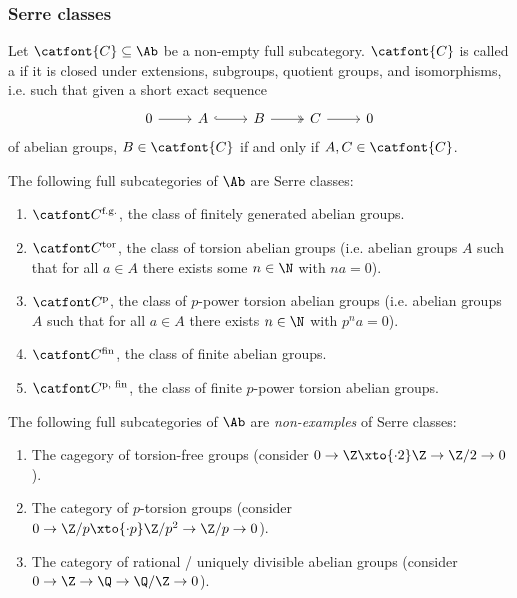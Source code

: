 \subsubsection{Serre classes}
\begin{definition}
	Let $\catfont{C} \subseteq \Ab$ be a non-empty full subcategory.
	$\catfont{C}$ is called a  if it is closed under extensions, subgroups, quotient groups, and isomorphisms, i.e. such that given a short exact sequence 
	\begin{equation*}
		\begin{tikzcd}
			0 
					\ar[r]
				& A
					\ar[r, hook]
				& B
					\ar[r, two heads]
				& C
					\ar[r]
				& 0
		\end{tikzcd}
	\end{equation*}
	of abelian groups, $B \in \catfont{C}$ if and only if $A, C \in \catfont{C}$.
\end{definition}
\begin{example}
	The following full subcategories of $\Ab$ are Serre classes:	
	\begin{enumerate}
		\item $\Cfg$, the class of finitely generated abelian groups.
		\item $\Ctor$, the class of torsion abelian groups (i.e. abelian groups $A$ such that for all $a \in A$ there exists some $n \in \N$ with $n a = 0$).
		\item $\Cptor$, the class of $p$-power torsion abelian groups (i.e. abelian groups $A$ such that for all $a \in A$ there exists $n \in \N$ with $p^n a = 0$).
		\item $\Cfin$, the class of finite abelian groups.
		\item $\Cfinp$, the class of finite $p$-power torsion abelian groups.
	\end{enumerate}
\end{example}
\begin{example}
	The following full subcategories of $\Ab$ are \emph{non-examples} of Serre classes:
	\begin{enumerate}
		\item The cagegory of torsion-free groups (consider $0 \to \Z \xto{\cdot 2} \Z \to \Zn{2} \to 0$).
		\item The category of $p$-torsion groups (consider $0 \to \Zn{p} \xto{\cdot p} \Zn{p^2} \to \Zn{p} \to 0$).
		\item The category of rational / uniquely divisible abelian groups (consider $0 \to \Z \to \Q \to \Q / \Z \to 0$).
	\end{enumerate}
\end{example}
